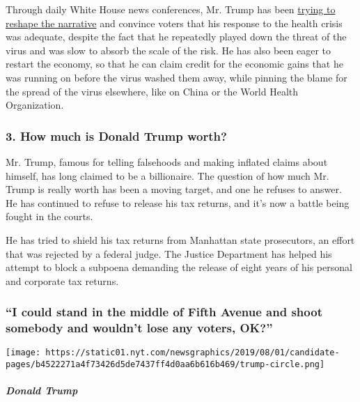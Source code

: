 Through daily White House news conferences, Mr. Trump has been
\href{https://www.nytimes.com/interactive/2020/04/26/us/politics/trump-coronavirus-briefings-analyzed.html}{trying
to reshape the narrative} and convince voters that his response to the
health crisis was adequate, despite the fact that he repeatedly played
down the threat of the virus and was slow to absorb the scale of the
risk. He has also been eager to restart the economy, so that he can
claim credit for the economic gains that he was running on before the
virus washed them away, while pinning the blame for the spread of the
virus elsewhere, like on China or the World Health Organization.

\hypertarget{3-how-much-is-donald-trump-worth}{%
\subsubsection{\texorpdfstring{\textbf{3. How much is Donald Trump
worth?}}{3. How much is Donald Trump worth?}}\label{3-how-much-is-donald-trump-worth}}

Mr. Trump, famous for telling falsehoods and making inflated claims
about himself, has long claimed to be a billionaire. The question of how
much Mr. Trump is really worth has been a moving target, and one he
refuses to answer. He has continued to refuse to release his tax
returns, and it's now a battle being fought in the courts.

He has tried to shield his tax returns from Manhattan state prosecutors,
an effort that was rejected by a federal judge. The Justice Department
has helped his attempt to block a subpoena demanding the release of
eight years of his personal and corporate tax returns.

\hypertarget{i-could-stand-in-the-middle-of-fifth-avenue-and-shoot-somebody-and-wouldnt-lose-any-voters-ok}{%
\subsubsection{``I could stand in the middle of Fifth Avenue and shoot
somebody and wouldn't lose any voters,
OK?''}\label{i-could-stand-in-the-middle-of-fifth-avenue-and-shoot-somebody-and-wouldnt-lose-any-voters-ok}}

\texttt{[image: https://static01.nyt.com/newsgraphics/2019/08/01/candidate-pages/b4522271a4f73426d5de7437ff4d0aa6b616b469/trump-circle.png]}

\hypertarget{donald-trump-1}{%
\subparagraph{Donald Trump}\label{donald-trump-1}}


